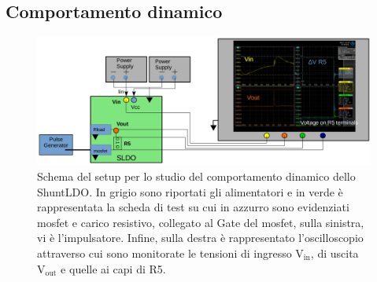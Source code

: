 %
%


\subsection{Comportamento dinamico}

\begin{figure}[!htb]
\centering
\includegraphics[scale=.3]{Immagini/SetupScheme}
\caption{Schema del setup per lo studio del comportamento dinamico dello ShuntLDO. In grigio sono riportati gli alimentatori e in verde è rappresentata la scheda di test su cui in azzurro sono evidenziati mosfet e carico resistivo, collegato al Gate del mosfet, sulla sinistra, vi è l'impulsatore. Infine, sulla destra è rappresentato l'oscilloscopio attraverso cui sono monitorate le tensioni di ingresso $\mathrm{V_{in}}$, di uscita $\mathrm{V_{out}}$ e quelle ai capi di R5.}
\label{Setupscheme}
\end{figure}

